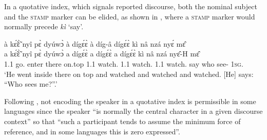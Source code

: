 In a quotative index, which signals reported discourse, both the nominal subject and the \textsc{stamp} marker can be elided, as shown in , where a \textsc{stamp} marker would normally precede {\itshape kì} `say'.


\ea \label{SOm}
  \glll à kɛ̃́ɛ̃̀ nyî pɛ̀ dyúwɔ̀ à dígɛ́ɛ̀ à díg-â dígɛ́ɛ̀ kì nâ nzá nyɛ́ mɛ̂ \\
        a kɛ̃́ɛ̃̀ nyî pɛ̀ dyúwɔ̀ a dígɛ́ɛ̀ a dígɛ́ɛ̀ a dígɛ́ɛ̀ kì nâ nzá nyɛ̂-H mɛ̂ \\
       1.{\PST}1 go.{\PRF} enter there on.top 1.{\PST}1 watch.{\PRF} 1.{\PST}1 watch.{\PRF} 1.{\PST}1 watch.{\PRF} say {\COMP} who see-{\R} 1\textsc{sg}.{\OBJ}  \\
    \trans `He went inside there on top and watched and watched and watched. [He] says: ``Who sees me?''.'
\z

\noindent Following \citet[105]{guldemann2008}, not encoding the speaker in a quotative index is permissible in some languages since the speaker ``is normally the central character in a given discourse context'' so that ``such a participant tends to assume the minimum force of reference, and in some languages this is zero expressed''.





